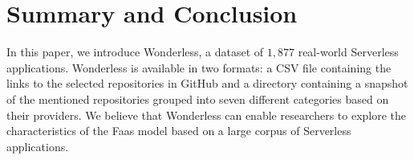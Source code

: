 \section{Summary and Conclusion}
\label{summary}

In this paper, we introduce Wonderless, a dataset of $1,877$ 
real-world Serverless applications. Wonderless is available in two 
formats: a CSV file containing the links to the selected repositories 
in GitHub and a directory containing a snapshot of the mentioned 
repositories grouped into seven different categories based on their providers. 
We believe that Wonderless can enable researchers to explore 
the characteristics of the Faas model based on a large corpus
of Serverless applications. 





